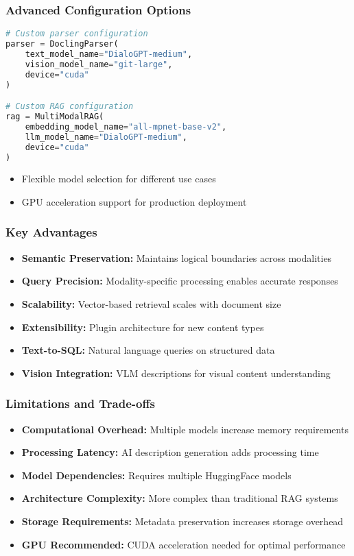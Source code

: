 \begin{frame}[fragile]\frametitle{Advanced Configuration Options}
\begin{lstlisting}[language=Python]
# Custom parser configuration
parser = DoclingParser(
    text_model_name="DialoGPT-medium",
    vision_model_name="git-large",
    device="cuda"
)

# Custom RAG configuration
rag = MultiModalRAG(
    embedding_model_name="all-mpnet-base-v2",
    llm_model_name="DialoGPT-medium",
    device="cuda"
)
\end{lstlisting}
\begin{itemize}
\item Flexible model selection for different use cases
\item GPU acceleration support for production deployment
\end{itemize}
\end{frame}

\begin{frame}[fragile]\frametitle{Key Advantages}
\begin{itemize}
\item \textbf{Semantic Preservation:} Maintains logical boundaries across modalities
\item \textbf{Query Precision:} Modality-specific processing enables accurate responses
\item \textbf{Scalability:} Vector-based retrieval scales with document size
\item \textbf{Extensibility:} Plugin architecture for new content types
\item \textbf{Text-to-SQL:} Natural language queries on structured data
\item \textbf{Vision Integration:} VLM descriptions for visual content understanding
\end{itemize}
\end{frame}

\begin{frame}[fragile]\frametitle{Limitations and Trade-offs}
\begin{itemize}
\item \textbf{Computational Overhead:} Multiple models increase memory requirements
\item \textbf{Processing Latency:} AI description generation adds processing time
\item \textbf{Model Dependencies:} Requires multiple HuggingFace models
\item \textbf{Architecture Complexity:} More complex than traditional RAG systems
\item \textbf{Storage Requirements:} Metadata preservation increases storage overhead
\item \textbf{GPU Recommended:} CUDA acceleration needed for optimal performance
\end{itemize}
\end{frame}

